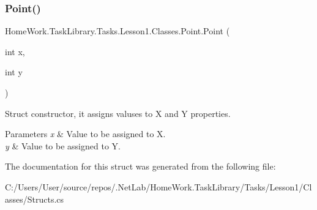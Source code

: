 \subsubsection{\texorpdfstring{Point()}{Point()}}
{\footnotesize\ttfamily Home\+Work.\+Task\+Library.\+Tasks.\+Lesson1.\+Classes.\+Point.\+Point (\begin{DoxyParamCaption}\item[{int}]{x,  }\item[{int}]{y }\end{DoxyParamCaption})}



Struct constructor, it assigns valuses to X and Y properties. 


\begin{DoxyParams}{Parameters}
{\em x} & Value to be assigned to X.\\
\hline
{\em y} & Value to be assigned to Y.\\
\hline
\end{DoxyParams}


The documentation for this struct was generated from the following file\+:\begin{DoxyCompactItemize}
\item 
C\+:/\+Users/\+User/source/repos/.\+Net\+Lab/\+Home\+Work.\+Task\+Library/\+Tasks/\+Lesson1/\+Classes/Structs.\+cs\end{DoxyCompactItemize}
